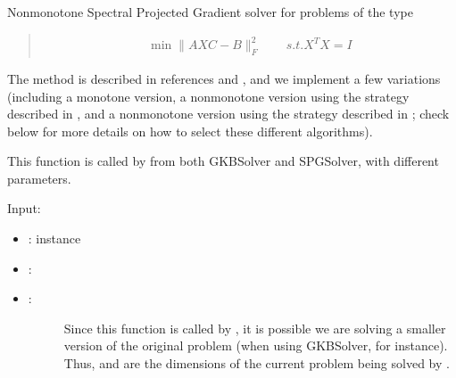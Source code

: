 \documentclass[a4paper,10pt,english]{sphinxmanual}
\begin{document}

\begin{fulllineitems}
\label{\detokenize{skprocrustes:skprocrustes.spectral_solver}}
Nonmonotone Spectral Projected Gradient solver for problems of the type
\begin{quote}
\begin{equation*}
\begin{split}\min \lVert AXC - B\rVert_F^2  \qquad s.t. X^TX = I\end{split}
\end{equation*}\end{quote}

The method is described in references \label{\detokenize{skprocrustes:id12}}{\hyperref[\detokenize{skprocrustes:franbaza12}]{\sphinxcrossref{{[}FB12{]}}}} and 
\label{\detokenize{skprocrustes:id13}}{\hyperref[\detokenize{skprocrustes:franbazawebe17}]{\sphinxcrossref{{[}FBM17{]}}}}, and we implement a few variations (including a 
monotone version, a nonmonotone version using the strategy described in 
\label{\detokenize{skprocrustes:id14}}{\hyperref[\detokenize{skprocrustes:franbaza12}]{\sphinxcrossref{{[}FB12{]}}}}, and a nonmonotone version using the strategy 
described in \label{\detokenize{skprocrustes:id15}}{\hyperref[\detokenize{skprocrustes:franbazawebe17}]{\sphinxcrossref{{[}FBM17{]}}}}; check below for more details on how 
to select these different algorithms).

This function is called by  from both GKBSolver and
SPGSolver, with different parameters.

Input:
\begin{itemize}
\item {} 
:  instance

\item {} 
: 

\item {} \begin{description}
\item[{: }] \leavevmode
Since this function is called by , it is possible
we are solving a smaller version of the original problem (when using
GKBSolver, for instance). Thus,  and  are the
dimensions of the current problem being solved by .


\end{description}
\end{itemize}
\end{fulllineitems}
\end{document}
